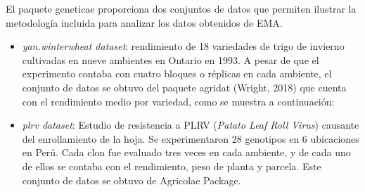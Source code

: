 El paquete geneticae proporciona dos conjuntos de datos que permiten ilustrar la metodología incluida para analizar los datos obtenidos de EMA.
\begin{itemize}[wide, nosep, labelindent = 0pt, topsep = 1ex, noitemsep,topsep=0pt]
\item \emph{yan.winterwheat dataset}: rendimiento de 18 variedades de trigo de invierno cultivadas en nueve ambientes en Ontario en 1993. A pesar de que el experimento contaba con cuatro bloques o réplicas en cada ambiente, el conjunto de datos se obtuvo del paquete agridat (Wright, 2018) que cuenta con el rendimiento medio por variedad, como se muestra a continuación:

\item \emph{plrv dataset}: Estudio de resistencia a PLRV (\emph{Patato Leaf Roll Virus}) causante del enrollamiento de la hoja. Se experimentaron 28 genotipos en 6 ubicaciones en Perú. Cada clon fue evaluado tres veces en cada ambiente, y de cada uno de ellos se contaba con el rendimiento, peso de planta y parcela. Este conjunto de datos se obtuvo de Agricolae Package.\\

\end{itemize}
  
